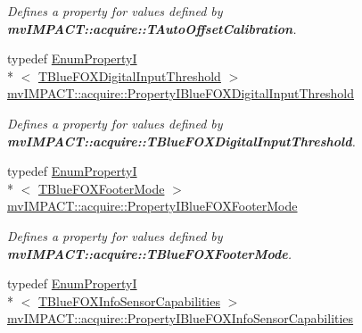\begin{DoxyCompactItemize}
\begin{DoxyCompactList}\small\item\em Defines a property for values defined by {\bfseries mv\+I\+M\+P\+A\+C\+T\+::acquire\+::\+T\+Auto\+Offset\+Calibration}. \end{DoxyCompactList}\item 
\hypertarget{group___device_specific_interface_gaa4592c9a62ecce3e3c51143034217bfd}{typedef \hyperlink{classmv_i_m_p_a_c_t_1_1acquire_1_1_enum_property_i}{Enum\+Property\+I}\\*
$<$ \hyperlink{group___device_specific_interface_gaea9362b2595ba187912465c014ddc069}{T\+Blue\+F\+O\+X\+Digital\+Input\+Threshold} $>$ \hyperlink{group___device_specific_interface_gaa4592c9a62ecce3e3c51143034217bfd}{mv\+I\+M\+P\+A\+C\+T\+::acquire\+::\+Property\+I\+Blue\+F\+O\+X\+Digital\+Input\+Threshold}}\label{group___device_specific_interface_gaa4592c9a62ecce3e3c51143034217bfd}

\begin{DoxyCompactList}\small\item\em Defines a property for values defined by {\bfseries mv\+I\+M\+P\+A\+C\+T\+::acquire\+::\+T\+Blue\+F\+O\+X\+Digital\+Input\+Threshold}. \end{DoxyCompactList}\item 
\hypertarget{group___device_specific_interface_ga8c511231b6952821a370f845fea50d00}{typedef \hyperlink{classmv_i_m_p_a_c_t_1_1acquire_1_1_enum_property_i}{Enum\+Property\+I}\\*
$<$ \hyperlink{group___device_specific_interface_gab15f8e0830706ee1d2326d65a0635955}{T\+Blue\+F\+O\+X\+Footer\+Mode} $>$ \hyperlink{group___device_specific_interface_ga8c511231b6952821a370f845fea50d00}{mv\+I\+M\+P\+A\+C\+T\+::acquire\+::\+Property\+I\+Blue\+F\+O\+X\+Footer\+Mode}}\label{group___device_specific_interface_ga8c511231b6952821a370f845fea50d00}

\begin{DoxyCompactList}\small\item\em Defines a property for values defined by {\bfseries mv\+I\+M\+P\+A\+C\+T\+::acquire\+::\+T\+Blue\+F\+O\+X\+Footer\+Mode}. \end{DoxyCompactList}\item 
\hypertarget{group___device_specific_interface_gafffac026d1345f9026199ff9e237f8ad}{typedef \hyperlink{classmv_i_m_p_a_c_t_1_1acquire_1_1_enum_property_i}{Enum\+Property\+I}\\*
$<$ \hyperlink{group___device_specific_interface_gadf8f04a2e8000f1b631efc902071b4fc}{T\+Blue\+F\+O\+X\+Info\+Sensor\+Capabilities} $>$ \hyperlink{group___device_specific_interface_gafffac026d1345f9026199ff9e237f8ad}{mv\+I\+M\+P\+A\+C\+T\+::acquire\+::\+Property\+I\+Blue\+F\+O\+X\+Info\+Sensor\+Capabilities}}\label{group___device_specific_interface_gafffac026d1345f9026199ff9e237f8ad}


\end{DoxyCompactItemize}
